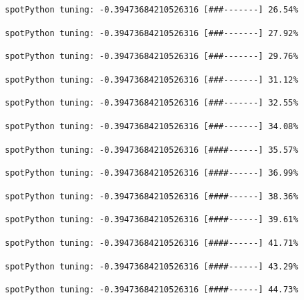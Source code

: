 \documentclass[
  letterpaper,
  DIV=11,
  numbers=noendperiod]{scrreprt}
\begin{document}
\begin{verbatim}
spotPython tuning: -0.39473684210526316 [###-------] 26.54% 
\end{verbatim}

\begin{verbatim}
spotPython tuning: -0.39473684210526316 [###-------] 27.92% 
\end{verbatim}

\begin{verbatim}
spotPython tuning: -0.39473684210526316 [###-------] 29.76% 
\end{verbatim}

\begin{verbatim}
spotPython tuning: -0.39473684210526316 [###-------] 31.12% 
\end{verbatim}

\begin{verbatim}
spotPython tuning: -0.39473684210526316 [###-------] 32.55% 
\end{verbatim}

\begin{verbatim}
spotPython tuning: -0.39473684210526316 [###-------] 34.08% 
\end{verbatim}

\begin{verbatim}
spotPython tuning: -0.39473684210526316 [####------] 35.57% 
\end{verbatim}

\begin{verbatim}
spotPython tuning: -0.39473684210526316 [####------] 36.99% 
\end{verbatim}

\begin{verbatim}
spotPython tuning: -0.39473684210526316 [####------] 38.36% 
\end{verbatim}

\begin{verbatim}
spotPython tuning: -0.39473684210526316 [####------] 39.61% 
\end{verbatim}

\begin{verbatim}
spotPython tuning: -0.39473684210526316 [####------] 41.71% 
\end{verbatim}

\begin{verbatim}
spotPython tuning: -0.39473684210526316 [####------] 43.29% 
\end{verbatim}

\begin{verbatim}
spotPython tuning: -0.39473684210526316 [####------] 44.73% 
\end{verbatim}
\end{document}
